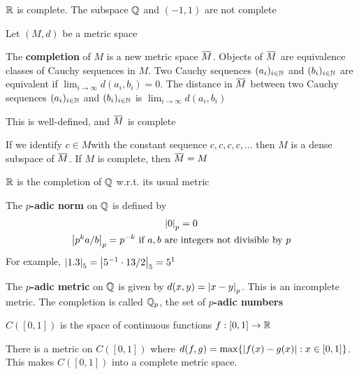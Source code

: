 \documentclass[11pt]{article}
\begin{document}
\begin{examplle}[]
\(\mathbb{R}\) is complete. The subspace \(\mathbb{Q}\) and \((-1,1)\) are not complete
\end{examplle}

Let \((M,d)\) be a metric space

\begin{definition}[]
The \textbf{completion} of \(M\) is a new metric space \(\barM\). Objects of \(\barM\) are equivalence
classes of Cauchy sequences in \(M\). Two Cauchy sequences \((a_i)_{i\in\mathbb{N}}\) and \((b_i)_{i\in\mathbb{N}}\) are
equivalent if \(\lim_{i\to\infty}d(a_i,b_i)=0\). The distance in \(\barM\) between two Cauchy
sequences \((a_i)_{i\in\mathbb{N}}\) and \((b_i)_{i\in\mathbb{N}}\) is \(\lim_{i\to\infty}d(a_i,b_i)\)
\end{definition}

\begin{proposition}[]
This is well-defined, and \(\barM\) is complete
\end{proposition}

\begin{proposition}[]
If we identify \(c\in M\)with the constant sequence \(c,c,c,c,\dots\) then \(M\) is a dense subspace
of \(\barM\). If \(M\) is complete, then \(\barM=M\)
\end{proposition}

\begin{examplle}[]
\(\mathbb{R}\) is the completion of \(\mathbb{Q}\) w.r.t. its usual metric
\end{examplle}

\begin{examplle}[]
The \textbf{\(p\)-adic norm} on \(\mathbb{Q}\) is defined by
\begin{gather*}
\abs{0}_p=0\\
\abs{p^ka/b}_p=p^{-k}\text{ if }a,b\text{ are integers not divisible by }p
\end{gather*}
For example, \(\abs{1.3}_5=\abs{5^{-1}\cdot 13/2}_5=5^1\)

The \textbf{\(p\)-adic metric} on \(\mathbb{Q}\) is given by \(d(x,y)=\abs{x-y}_p\). This is an incomplete metric.
The completion is called \(\mathbb{Q}_p\), the set of \textbf{\(p\)-adic numbers}
\end{examplle}

\begin{definition}[]
\(C([0,1])\) is the space of continuous functions \(f:[0,1]\to\mathbb{R}\)
\end{definition}

\begin{proposition}[]
There is a metric on \(C([0,1])\) where \(d(f,g)=\max\{\abs{f(x)-g(x)}:x\in[0,1]\}\). This
makes \(C([0,1])\) into a complete metric space.
\end{proposition}
\end{document}

